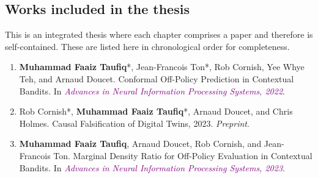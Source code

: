 \subsection{Works included in the thesis}
This is an integrated thesis where each chapter comprises a paper and therefore is self-contained.
These are listed here in chronological order for completeness.
\begin{enumerate}
    \item \textbf{Muhammad Faaiz Taufiq}*, Jean-Francois Ton*, Rob Cornish, Yee Whye Teh, and Arnaud Doucet.
    Conformal Off-Policy Prediction in Contextual Bandits. In \textit{\textcolor{purple}{Advances in Neural Information Processing
    Systems, 2022}}. \citep{taufiq2022conformal}
    \item Rob Cornish*, \textbf{Muhammad Faaiz Taufiq}*, Arnaud Doucet, and Chris Holmes. Causal Falsification
    of Digital Twins, 2023. \textit{Preprint}. \citep{cornish2023causalfalsificationdigitaltwins}
    \item \textbf{Muhammad Faaiz Taufiq}, Arnaud Doucet, Rob Cornish, and Jean-Francois Ton. Marginal Density Ratio for Off-Policy Evaluation in Contextual Bandits. In 
    \textit{\textcolor{purple}{Advances in Neural Information Processing Systems, 2023}}. \citep{taufiq2023marginal}
\end{enumerate}


